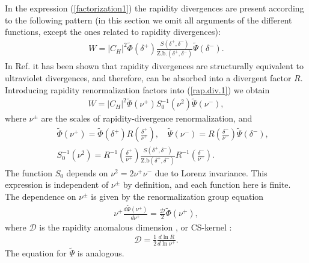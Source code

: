 \documentclass[a4paper, amsfonts, amssymb, amsmath, reprint, showkeys, nofootinbib, twoside]{revtex4-1}
\newcommand{\nn}{\nonumber}
\renewcommand{\(}{\left(}
\renewcommand{\)}{\right)}
\renewcommand{\[}{\left[}
\renewcommand{\]}{\right]}
\begin{document}
In the expression (\ref{factorization1}) the rapidity divergences are present according to the following pattern (in this section we omit all arguments of the different functions, except the ones related to rapidity divergences):
\begin{eqnarray}\label{rap.div.1}
W=|C_H|^2\widetilde{\Phi}(\delta^+)\frac{S(\delta^+,\delta^-)}{\text{Z.b.}(\delta^+,\delta^-)}\widetilde{\Psi}(\delta^-).
\end{eqnarray}
In Ref.\cite{Vladimirov:2017ksc} it has been shown that rapidity divergences are structurally equivalent to ultraviolet divergences, and therefore, can be absorbed into a divergent factor $R$. Introducing rapidity renormalization factors into (\ref{rap.div.1}) we obtain
\begin{eqnarray}\label{rap.div.2}
W=|C_H|^2\widetilde{\Phi}(\nu^+)S^{-1}_0(\nu^2)\widetilde{\Psi}(\nu^-),
\end{eqnarray}
where $\nu^\pm$ are the scales of rapidity-divergence renormalization, and 
\begin{eqnarray}\nn
&&\widetilde{\Phi}(\nu^+)=\widetilde{\Phi}(\delta^+)R\(\frac{\delta^+}{\nu^+}\),
\quad
\widetilde{\Psi}(\nu^-)=R\(\frac{\delta^-}{\nu^-}\)\widetilde{\Psi}(\delta^-),
\\\nn 
&&S_0^{-1}(\nu^2)=R^{-1}\(\frac{\delta^+}{\nu^+}\)\frac{S(\delta^+,\delta^-)}{\text{Z.b}(\delta^+,\delta^-)}R^{-1}\(\frac{\delta^-}{\nu^-}\).
\end{eqnarray}
The function $S_0$ depends on $\nu^2=2\nu^+\nu^-$ due to Lorenz invariance. This expression is independent of $\nu^\pm$ by definition, and each function here is finite. The dependence on $\nu^\pm$ is given by the renormalization group equation
\begin{eqnarray}\label{dnuPhi}
\nu^+\frac{d \widetilde{\Phi}(\nu^+)}{d\nu^+}=\frac{\mathcal{D}}{2}\widetilde{\Phi}(\nu^+),
\end{eqnarray}
where $\mathcal{D}$ is the rapidity anomalous dimension \cite{Vladimirov:2017ksc}, or CS-kernel \cite{Collins:1981va}:
\begin{eqnarray}
\mathcal{D}=\frac{1}{2}\frac{d \ln R}{d\ln\nu^+}.
\end{eqnarray}
 The equation for $\widetilde{\Psi}$ is analogous.
\end{document}

